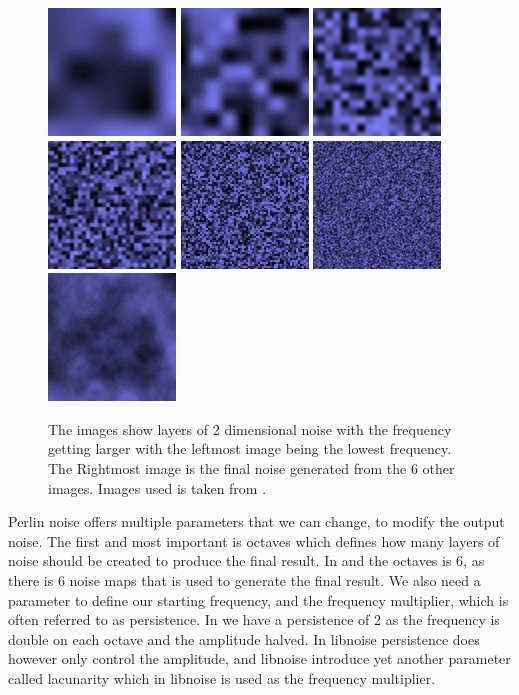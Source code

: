 \begin{figure}[H]
	\includegraphics[width=0.135\linewidth]{img/perlin_a}
	\includegraphics[width=0.135\linewidth]{img/perlin_b}
	\includegraphics[width=0.135\linewidth]{img/perlin_c}
	\includegraphics[width=0.135\linewidth]{img/perlin_d}
	\includegraphics[width=0.135\linewidth]{img/perlin_e}
	\includegraphics[width=0.135\linewidth]{img/perlin_f}
	\includegraphics[width=0.135\linewidth]{img/p_128}
	\centering
	\caption{The images show layers of 2 dimensional noise with the frequency getting larger with the leftmost image being the lowest frequency. The Rightmost image is the final noise generated from the 6 other images. Images used is taken from \cite{perlinnoise2}.}
	\label{fig:2DNoise}
\end{figure}

Perlin noise offers multiple parameters that we can change, to modify the output noise. The first and most important is octaves which defines how many layers of noise should be created to produce the final result. In  and  the octaves is 6, as there is 6 noise maps that is used to generate the final result. We also need a parameter to define our starting frequency, and the frequency multiplier, which is often referred to as persistence. In  we have a persistence of 2 as the frequency is double on each octave and the amplitude halved. In libnoise persistence does however only control the amplitude, and libnoise introduce yet another parameter called lacunarity which in libnoise is used as the frequency multiplier\cite{libnoisePerlin}.

